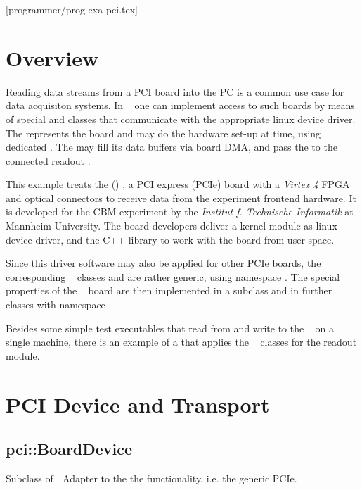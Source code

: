 [programmer/prog-exa-pci.tex]
\label{prog-exa-pci-chapter}
\section{Overview}
Reading data streams from a PCI board into the PC is a common use case
for data acquisiton systems. In \dabc~ one can implement access to
such boards by means of special  and 
classes that communicate with the appropriate linux device driver.
The  represents the board and may do the hardware set-up 
at  time, using dedicated . 
The  may fill its data buffers via board DMA, and
pass the  to the connected readout . 

This example treats the
 (\ABB) \cite{AbbDescription}
, 
a PCI express (PCIe) board 
 with a {\em Virtex 4}
FPGA and optical connectors to receive data from the experiment frontend
hardware. It is developed for the CBM experiment \cite{CBM-stat-rep}
by the {\em Institut f. Technische Informatik} at Mannheim University. 
The board developers deliver a kernel module as linux device driver,
and the  C++ library to work with the board from user space.

Since this driver software may also be applied for other PCIe boards,
the corresponding \dabc~ classes  and 
are rather generic, using namespace .
The special properties of the \ABB~ board are then implemented in
a  subclass and in further classes with namespace
. 

Besides some simple test executables that read from and write to the 
\ABB~ on a single machine, there is an example of a 
that applies the \ABB~ classes for the readout module.    
 


\section{PCI Device and Transport}


\subsection{pci::BoardDevice}
Subclass of . Adapter to the the  functionality, i.e. the generic PCIe.

